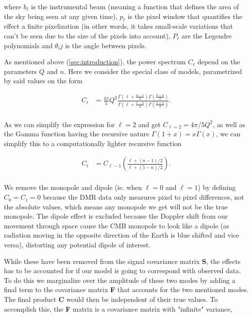 \documentclass{emulateapj}
\begin{document}
 \noindent
 where $b_{\ell}$ is the instrumental beam (meaning a function that defines the area of the sky being seen at any given time), $p_{\ell}$ is the pixel window that quantifies the effect a finite pixelization (in other words, it takes small-scale variations that can't be seen due to the size of the pixels into account), $P_{\ell}$ are the Legendre polynomials and $\theta_ij$ is the angle between pixels.
 
 As mentioned above (\ref{sec:introduction}), the power spectrum $C_\ell$ depend on the parameters $Q$ and $n$. Here we consider the special class of models, parametrized by said values on the form
 
  \begin{equation}
  \label{c_ell}
  \begin{array}{rl}
  C_{\ell} &= \frac{4\pi}{5}Q^2 \frac{\Gamma(\ell + \frac{n-1}{2})\Gamma(\frac{9-n}{2})}{\Gamma(\ell + \frac{5-n}{2})\Gamma(\frac{3+n}{2})}.  \\ 
  \end{array}
  \end{equation}
 
\noindent
As we can simplify the expression for $\ell = 2$ and get $C_{\ell=2} = 4\pi/5 Q^2$, as well as the Gamma function having the recursive nature $\Gamma(1+x) = x\Gamma(x)$, we can simplify this to a computationally lighter recursive function  
 
 
\begin{equation}
  \label{c_ell_num}
  \begin{array}{rl}
  C_{\ell} &= C_{\ell - 1} (\frac{\ell+(n-1)/2}{\ell+(5-n)/2}).   \\ 
  \end{array}
\end{equation}


\noindent
We remove the monopole and dipole (ie. when $\ell = 0$ and $\ell = 1$) by defining $C_0 = C_1 = 0$ because the DMR data only measures pixel to pixel differences, not the absolute values, which means any monopole we get will not be the true monopole. The dipole effect is excluded because the Doppler shift from our movement through space cause the CMB monopole to look like a dipole (as radiation moving in the opposite direction of the Earth is blue shifted and vice versa), distorting any potential dipole of interest.
 
While these have been removed from the signal covariance matrix \textbf{S}, the effects has to be accounted for if our model is going to correspond with observed data. To do this we marginalize over the amplitude of these two modes by adding a final term to the covariance matrix \textbf{F} that accounts for the two mentioned modes. %
The final product \textbf{C} would then be independent of their true values. To accomplish this, the \textbf{F} matrix is a covariance matrix with "infinite" variance,
\end{document}
